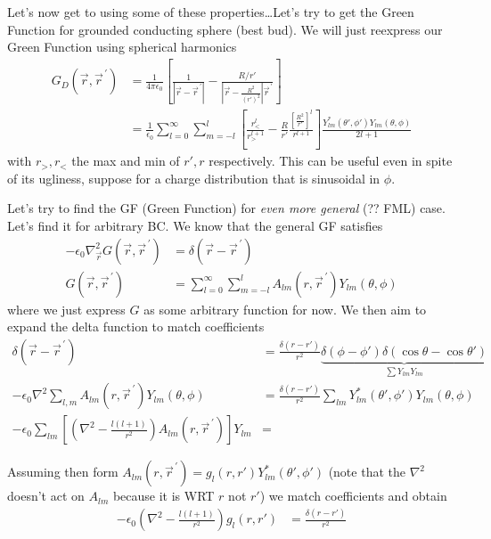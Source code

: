 \documentclass[10pt]{report}
\newcommand{\pvec}[1]{\vec{#1}^{\,\prime}}
\newcommand{\abs}[1]{\left|#1\right|}
\begin{document}
Let's now get to using some of these properties\dots Let's try to get the Green Function for grounded conducting sphere (best bud). We will just reexpress our Green Function using spherical harmonics
\begin{align}
    G_D(\vec{r}, \pvec{r}) &= \frac{1}{4\pi\epsilon_0}\left[ \frac{1}{\abs{\vec{r} - \pvec{r}}} - \frac{R/r'}{\abs{\vec{r} - \frac{R^2}{(r')^2}}\pvec{r}} \right]\\
    &= \frac{1}{\epsilon_0}\sum_{l=0}^{\infty}\sum_{m=-l}^{l}\left[ \frac{r_<^l}{r_>^{l+1}} - \frac{R}{r'}\frac{\left[ \frac{R^2}{r'}\right]^l}{r^{l+1}} \right]\frac{Y_{lm}^*(\theta',\phi')Y_{lm}(\theta,\phi)}{2l+1}
\end{align}
with $r_>, r_<$ the max and min of $r',r$ respectively. This can be useful even in spite of its ugliness, suppose for a charge distribution that is sinusoidal in $\phi$. 

Let's try to find the GF (Green Function) for \emph{even more general} (?? FML) case. Let's find it for arbitrary BC. We know that the general GF satisfies
\begin{align}
    -\epsilon_0 \nabla^2_{\vec{r}}G(\vec{r}, \pvec{r}) &= \delta(\vec{r} - \pvec{r})\\
    G(\vec{r}, \pvec{r}) &= \sum_{l=0}^{\infty}\sum_{m=-l}^{l}A_{lm}(r, \pvec{r})Y_{lm}(\theta,\phi)
\end{align}
where we just express $G$ as some arbitrary function for now. We then aim to expand the delta function to match coefficients
\begin{align}
    \delta(\vec{r} - \pvec{r}) &= \frac{\delta(r-r')}{r^2}\underbrace{\delta(\phi -\phi') \delta(\cos\theta - \cos\theta')}_{\sum Y_{lm} Y_{lm}}\\
    -\epsilon_0 \nabla^2 \sum_{l,m}^{}A_{lm}(r, \pvec{r}) Y_{lm}(\theta,\phi) &= \frac{\delta(r-r')}{r^2}\sum_{lm}^{}Y_{lm}^*(\theta', \phi')Y_{lm}(\theta,\phi)\\
    -\epsilon_0\sum_{lm}^{}\left[ \left( \nabla^2  - \frac{l(l+1)}{r^2} \right)A_{lm}(r, \pvec{r}) \right]Y_{lm} &=
\end{align}

Assuming then form $A_{lm}(r, \pvec{r}) = g_l(r, r')Y_{lm}^*(\theta', \phi')$ (note that the $\nabla^2$ doesn't act on $A_{lm}$ because it is WRT $r$ not $r'$) we match coefficients and obtain
\begin{align}
    -\epsilon_0\left( \nabla^2 -\frac{l(l+1)}{r^2} \right)g_l(r,r') &= \frac{\delta(r-r')}{r^2}
\end{align}
\end{document}
